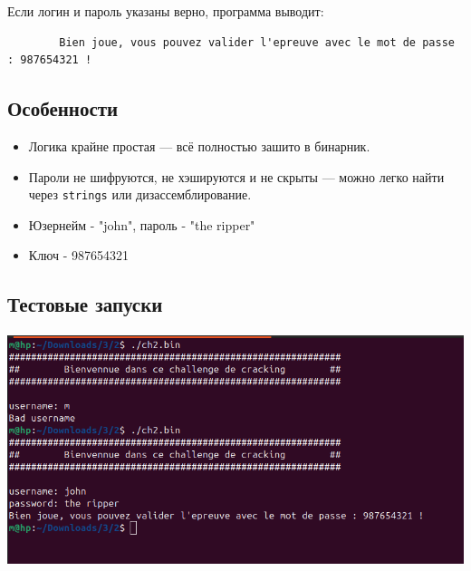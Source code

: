     Если логин и пароль указаны верно, программа выводит:

    \begin{verbatim}
        Bien joue, vous pouvez valider l'epreuve avec le mot de passe : 987654321 !
    \end{verbatim}


    \subsection{Особенности}

    \begin{itemize}
        \item Логика крайне простая — всё полностью зашито в бинарник.
        \item Пароли не шифруются, не хэшируются и не скрыты — можно легко найти через \texttt{strings} или дизассемблирование.
        \item Юзернейм - "john", пароль - "the ripper"
        \item Ключ - 987654321
    \end{itemize}

    \subsection{Тестовые запуски}
    \paragraph{}
    \includegraphics[width=1\linewidth]{static/solution_2}
